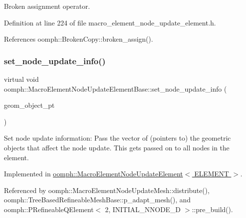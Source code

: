 Broken assignment operator. 



Definition at line 224 of file macro\+\_\+element\+\_\+node\+\_\+update\+\_\+element.\+h.



References oomph\+::\+Broken\+Copy\+::broken\+\_\+assign().

\mbox{\label{classoomph_1_1MacroElementNodeUpdateElementBase_a21fd47abb3a0fff0920e4b70b9186199}} 
\subsubsection{\texorpdfstring{set\+\_\+node\+\_\+update\+\_\+info()}{set\_node\_update\_info()}}
{\footnotesize\ttfamily virtual void oomph\+::\+Macro\+Element\+Node\+Update\+Element\+Base\+::set\+\_\+node\+\_\+update\+\_\+info (\begin{DoxyParamCaption}\item[{const \hyperlink{classoomph_1_1Vector}{Vector}$<$ \hyperlink{classoomph_1_1GeomObject}{Geom\+Object} $\ast$$>$ \&}]{geom\+\_\+object\+\_\+pt }\end{DoxyParamCaption})\hspace{0.3cm}{\ttfamily [pure virtual]}}



Set node update information\+: Pass the vector of (pointers to) the geometric objects that affect the node update. This gets passed on to all nodes in the element. 



Implemented in \hyperlink{classoomph_1_1MacroElementNodeUpdateElement_a229ef724fbfd1917159508bde5207fb5}{oomph\+::\+Macro\+Element\+Node\+Update\+Element$<$ E\+L\+E\+M\+E\+N\+T $>$}.



Referenced by oomph\+::\+Macro\+Element\+Node\+Update\+Mesh\+::distribute(), oomph\+::\+Tree\+Based\+Refineable\+Mesh\+Base\+::p\+\_\+adapt\+\_\+mesh(), and oomph\+::\+P\+Refineable\+Q\+Element$<$ 2, I\+N\+I\+T\+I\+A\+L\+\_\+\+N\+N\+O\+D\+E\+\_\+D $>$\+::pre\+\_\+build().




